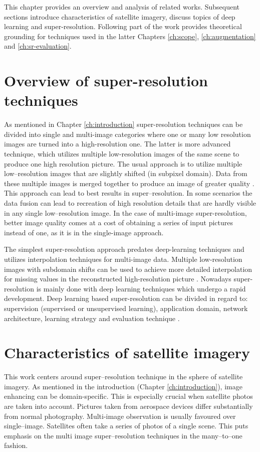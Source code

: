 This chapter provides an overview and analysis of related works.
Subsequent sections introduce characteristics of satellite imagery, discuss topics of deep learning and super-resolution.
Following part of the work provides theoretical grounding for techniques used in the latter Chapters \ref{ch:scope}, \ref{ch:augmentation} and \ref{ch:sr-evaluation}.

\section{Overview of super-resolution techniques}
As mentioned in Chapter \ref{ch:introduction} super-resolution techniques can be divided into single and multi-image categories where one or many low resolution images are turned into a high-resolution one.
The latter is more advanced technique, which utilizes multiple low-resolution
images of the same scene to produce one high resolution picture.
The usual approach is to utilize multiple low--resolution images that are slightly shifted (in subpixel domain).
Data from these multiple images is merged together to produce an image of greater quality \cite{kawulok-2019-multisr}.
This approach can lead to best results in super--resolution.
In some scenarios the data fusion can lead to recreation of high resolution details that are hardly visible in any single low--resolution image.
In the case of multi-image super-resolution, better image quality comes at a cost of obtaining a series of input pictures instead of one, as it is in the single-image approach.

The simplest super-resolution approach predates deep-learning techniques and utilizes interpolation techniques for multi-image data.
Multiple low-resolution images with subdomain shifts can be used to achieve more detailed interpolation for missing values in the reconstructed high-resolution picture \cite{park-2003-sr}.
Nowadays super-resolution is mainly done with deep learning techniques which undergo a rapid development.
Deep learning based super-resolution can be divided in regard to: supervision (supervised or unsupervised learning), application domain, network architecture, learning strategy and evaluation technique \cite{wang-2019-srsurvey, bashir-2021-srreview}.

\section{Characteristics of satellite imagery}
This work centers around super--resolution technique in the sphere of satellite imagery.
As mentioned in the introduction (Chapter \ref{ch:introduction}), image enhancing can be domain-specific.
This is especially crucial when satellite photos are taken into account.
Pictures taken from aerospace devices differ substantially from normal photography.
Multi-image observation is usually favoured over single--image.
Satellites often take a series of photos of a single scene.
This puts emphasis on the multi image super--resolution techniques in the many--to--one fashion.

